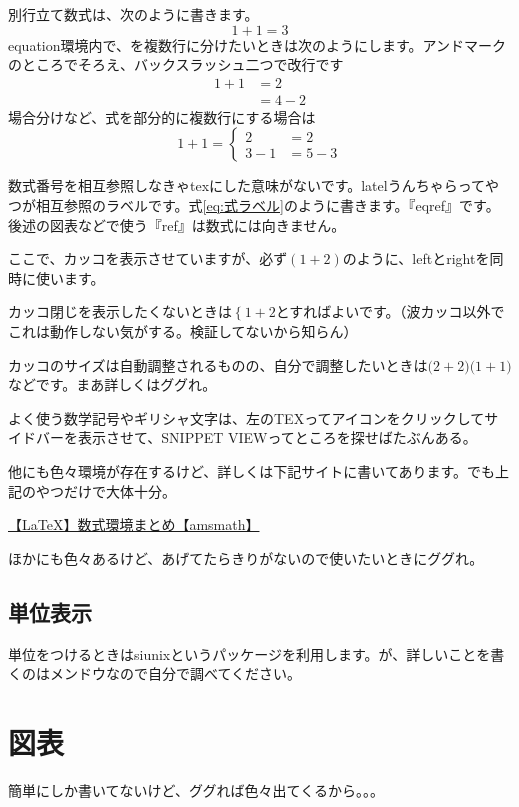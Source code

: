 \documentclass[uplatex,dvipdfmx]{jsarticle}
\numberwithin{equation}{section}
\begin{document}
別行立て数式は、次のように書きます。
\begin{equation}
  1+1=3
\end{equation}
equation環境内で、を複数行に分けたいときは次のようにします。アンドマークのところでそろえ、バックスラッシュ二つで改行です
\begin{equation}\label{eq:式ラベル}
  \begin{split}
    1+1&=2\\
    &=4-2
  \end{split}
\end{equation}
場合分けなど、式を部分的に複数行にする場合は
\begin{equation}
  1+1= \left\{ 
  \begin{aligned} 
    2&=2\\
    3-1&=5-3
  \end{aligned}
  \right.
\end{equation}

数式番号を相互参照しなきゃtexにした意味がないです。latelうんちゃらってやつが相互参照のラベルです。式\eqref{eq:式ラベル}のように書きます。『eqref』です。後述の図表などで使う『ref』は数式には向きません。

ここで、カッコを表示させていますが、必ず$\left(1+2\right)$のように、leftとrightを同時に使います。

カッコ閉じを表示したくないときは$\left\{1+2\right.$とすればよいです。（波カッコ以外でこれは動作しない気がする。検証してないから知らん）

カッコのサイズは自動調整されるものの、自分で調整したいときは$\Biggl(2+2\Biggr) \bigl(1+1\bigr)$などです。まあ詳しくはググれ。

よく使う数学記号やギリシャ文字は、左のTEXってアイコンをクリックしてサイドバーを表示させて、SNIPPET VIEWってところを探せばたぶんある。

他にも色々環境が存在するけど、詳しくは下記サイトに書いてあります。でも上記のやつだけで大体十分。

\href{https://mathlandscape.com/latex-eq/#toc3}{【LaTeX】数式環境まとめ【amsmath】}

ほかにも色々あるけど、あげてたらきりがないので使いたいときにググれ。

\subsection{単位表示}
単位をつけるときはsiunixというパッケージを利用します。が、詳しいことを書くのはメンドウなので自分で調べてください。

\section{図表}
簡単にしか書いてないけど、ググれば色々出てくるから。。。
\end{document}
